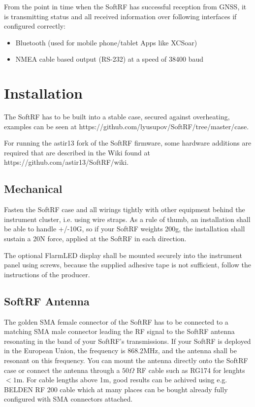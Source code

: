 \documentclass[11pt,a4paper]{article}
\begin{document}
From the point in time when the SoftRF has successful reception from GNSS, it is transmitting status and all received information over following interfaces if configured correctly:
\begin{itemize}
\item Bluetooth (used for mobile phone/tablet Apps like XCSoar)
\item NMEA cable based output (RS-232) at a speed of 38400 baud
\end{itemize}

\section{Installation}
The SoftRF has to be built into a stable case, secured against overheating, examples can be seen at https://github.com/lyusupov/SoftRF/tree/master/case.

For running the astir13 fork of the SoftRF firmware, some hardware additions are required that are described in the Wiki found at https://github.com/astir13/SoftRF/wiki.

\subsection{Mechanical}
Fasten the SoftRF case and all wirings tightly with other equipment behind the instrument cluster, i.e. using wire straps. As a rule of thumb, an installation shall be able to handle +/-10G, so if your SoftRF weights 200g, the installation shall sustain a 20N force, applied at the SoftRF in each direction.

The optional FlarmLED display shall be mounted securely into the instrument panel using screws, because the supplied adhesive tape is not sufficient, follow the instructions of the producer.

\begin{center}
\end{center}

\subsection{SoftRF Antenna}
The golden SMA female connector of the SoftRF has to be connected to a matching SMA male connector leading the RF signal to the SoftRF antenna resonating in the band of your SoftRF's transmissions. If your SoftRF is deployed in the European Union, the frequency is $868.2$MHz, and the antenna shall be resonant on this frequency. You can mount the antenna directly onto the SoftRF case or connect the antenna through a $50 \Omega$ RF cable such as RG174 for lenghts $< 1$m. For cable lengths above 1m, good results can be achived using e.g. BELDEN RF 200 cable which at many places can be bought already fully configured with SMA connectors attached.
\end{document}
